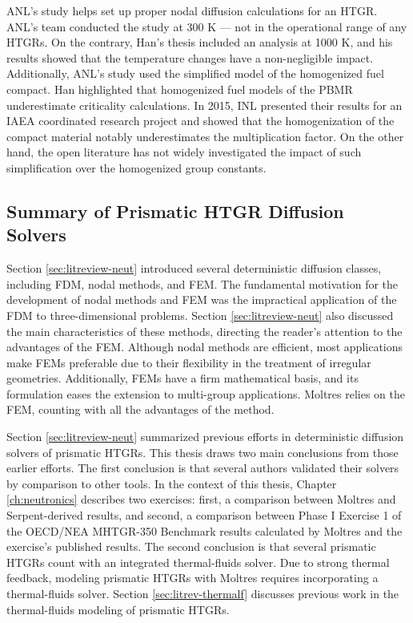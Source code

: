 ANL's study helps set up proper nodal diffusion calculations for an \gls{HTGR}.
ANL's team conducted the study at 300 K --- not in the operational range of any \glspl{HTGR}.
On the contrary, Han's thesis included an analysis at 1000 K, and his results showed that the temperature changes have a non-negligible impact.
Additionally, ANL's study used the simplified model of the homogenized fuel compact.
Han highlighted that homogenized fuel models of the \gls{PBMR} underestimate criticality calculations.
In 2015, \gls{INL} presented their results \cite{strydom_results_2015} for an \gls{IAEA} coordinated research project \cite{tyobeka_htgr_2011} and showed that the homogenization of the compact material notably underestimates the multiplication factor.
On the other hand, the open literature has not widely investigated the impact of such simplification over the homogenized group constants.

\subsection{Summary of Prismatic HTGR Diffusion Solvers}

Section \ref{sec:litreview-neut} introduced several deterministic diffusion classes, including FDM, nodal methods, and FEM.
The fundamental motivation for the development of nodal methods and FEM was the impractical application of the \gls{FDM} to three-dimensional problems.
Section \ref{sec:litreview-neut} also discussed the main characteristics of these methods, directing the reader's attention to the advantages of the FEM.
Although nodal methods are efficient, most applications make FEMs preferable due to their flexibility in the treatment of irregular geometries.
Additionally, FEMs have a firm mathematical basis, and its formulation eases the extension to multi-group applications.
Moltres relies on the FEM, counting with all the advantages of the method.

Section \ref{sec:litreview-neut} summarized previous efforts in deterministic diffusion solvers of prismatic HTGRs.
This thesis draws two main conclusions from those earlier efforts.
The first conclusion is that several authors validated their solvers by comparison to other tools.
In the context of this thesis, Chapter \ref{ch:neutronics} describes two exercises: first, a comparison between Moltres and Serpent-derived results, and second, a comparison between Phase I Exercise 1 of the OECD/NEA MHTGR-350 Benchmark results calculated by Moltres and the exercise's published results.
The second conclusion is that several prismatic HTGRs count with an integrated thermal-fluids solver.
Due to strong thermal feedback, modeling prismatic HTGRs with Moltres requires incorporating a thermal-fluids solver.
Section \ref{sec:litrev-thermalf} discusses previous work in the thermal-fluids modeling of prismatic HTGRs.

